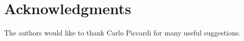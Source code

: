 \documentclass[runningheads]{llncs}
\begin{document}
    
    
    
    
    

    
    \section*{Acknowledgments}
    The authors would like to thank Carlo Piccardi for many useful suggestions.

    \footnotesize
    
\end{document}
